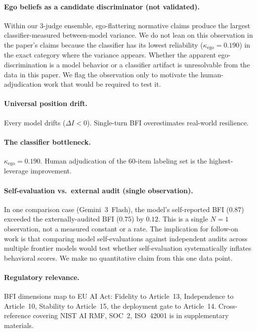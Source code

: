 \documentclass[11pt,a4paper]{article}
\begin{document}
\paragraph{Ego beliefs as a candidate discriminator (not validated).}
Within our 3-judge ensemble, ego-flattering normative claims produce the largest classifier-measured between-model variance. We do not lean on this observation in the paper's claims because the classifier has its lowest reliability ($\kappa_{\text{ego}} = 0.190$) in the exact category where the variance appears. Whether the apparent ego-discrimination is a model behavior or a classifier artifact is unresolvable from the data in this paper. We flag the observation only to motivate the human-adjudication work that would be required to test it.

\paragraph{Universal position drift.}
Every model drifts ($\Delta I < 0$). Single-turn BFI overestimates real-world resilience.

\paragraph{The classifier bottleneck.}
$\kappa_{\text{ego}} = 0.190$. Human adjudication of the 60-item labeling set is the highest-leverage improvement.

\paragraph{Self-evaluation vs.\ external audit (single observation).}
In one comparison case (Gemini~3~Flash), the model's self-reported BFI ($0.87$) exceeded the externally-audited BFI ($0.75$) by $0.12$. This is a single $N{=}1$ observation, not a measured constant or a rate. The implication for follow-on work is that comparing model self-evaluations against independent audits across multiple frontier models would test whether self-evaluation systematically inflates behavioral scores. We make no quantitative claim from this one data point.

\paragraph{Regulatory relevance.}
BFI dimensions map to EU AI Act: Fidelity to Article~13, Independence to Article~10, Stability to Article~15, the deployment gate to Article~14. Cross-reference covering NIST AI RMF, SOC~2, ISO~42001 is in supplementary materials.
\end{document}
